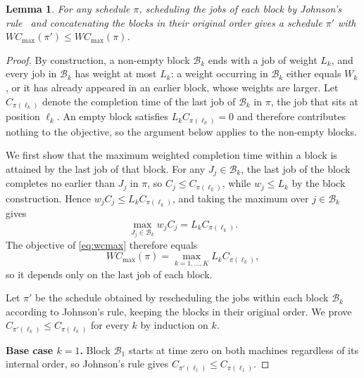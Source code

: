 \documentclass[12pt]{article}
\newtheorem{lemma}{Lemma}[section]
\begin{document}
\begin{sloppypar}
        \begin{lemma}\label{lem:block-johnson}
            For any schedule $\pi$, scheduling the jobs of each block by Johnson's rule~\citep{johnson1954optimal}
            and concatenating the blocks in their original order gives a schedule $\pi'$ with
            $W C_{\max}(\pi') \le W C_{\max}(\pi)$.
        \end{lemma}
        \begin{proof}
            By construction, a non-empty block $\mathcal{B}_k$ ends with a job of weight $L_k$, and every job in
            $\mathcal{B}_k$ has weight at most $L_k$: a weight occurring in $\mathcal{B}_k$ either equals $W_k$,
            or it has already appeared in an earlier block, whose weights are larger. Let $C_{\pi(\ell_k)}$
            denote the completion time of the last job of $\mathcal{B}_k$ in $\pi$, the job that sits at
            position $\ell_k$. An empty block
            satisfies $L_k C_{\pi(\ell_k)} = 0$ and therefore contributes nothing to the objective, so the
            argument below applies to the non-empty blocks.
            
            We first show that the maximum weighted completion time within a block is attained by the last job of
            that block. For any $J_j \in \mathcal{B}_k$, the last job of the block completes no earlier than
            $J_j$ in $\pi$, so $C_j \le C_{\pi(\ell_k)}$, while $w_j \le L_k$ by the block construction.
            Hence
            $w_j C_j \le L_k C_{\pi(\ell_k)}$, and taking the maximum over $j \in \mathcal{B}_k$ gives
            \[
            \max_{J_j \in \mathcal{B}_k} w_j C_j = L_k C_{\pi(\ell_k)}.
            \]
            The objective of \cref{eq:wcmax} therefore equals
            \[
            W C_{\max}(\pi) = \max_{k=1,\dots,K} L_k C_{\pi(\ell_k)},
            \]
            so it depends only on the last job of each block.
            
            Let $\pi'$ be the schedule obtained by rescheduling the jobs within each block $\mathcal{B}_k$
            according to Johnson's rule, keeping the blocks in their original order. We prove
            $C_{\pi'(\ell_k)} \le C_{\pi(\ell_k)}$ for every $k$ by induction on $k$.
            
            \textbf{Base case $k=1$.}
            Block $\mathcal{B}_1$ starts at time zero on both machines regardless of its internal order, so
            Johnson's rule gives $C_{\pi'(\ell_1)} \le C_{\pi(\ell_1)}$.
            

\end{proof}
\end{sloppypar}
\end{document}

